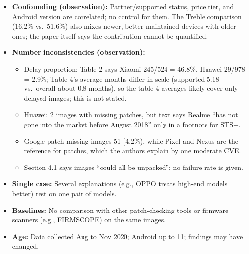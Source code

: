 \documentclass[11pt,a4paper]{article}
\begin{document}
\begin{enumerate}
\begin{itemize}[leftmargin=*,itemsep=1pt,topsep=2pt]
\begin{itemize}[itemsep=0pt]
            \item Observation: Q3 ``unfixed'' compares CVE disclosure time with ROM build time and app version; apps patched at the module level with unchanged version strings could be mislabeled.
            \item Observation: causal wording (``insufficient security efforts'', ``developer gave up maintaining'', ``excessive trust'') is not tested; Table 4 shows correlations only.
        \end{itemize}
        \item \textbf{Confounding (observation):} Partner/supported status, price tier, and Android version are correlated; no control for them. The Treble comparison (16.2\% vs.\ 51.6\%) also mixes newer, better-maintained devices with older ones; the paper itself says the contribution cannot be quantified.
        \item \textbf{Number inconsistencies (observation):}
        \begin{itemize}[itemsep=0pt]
            \item Delay proportion: Table 2 says Xiaomi 245/524 = 46.8\%, Huawei 29/978 = 2.9\%; Table 4's average months differ in scale (supported 5.18 vs.\ overall about 0.8 months), so the table 4 averages likely cover only delayed images; this is not stated.
            \item Huawei: 2 images with missing patches, but text says Realme ``has not gone into the market before August 2018'' only in a footnote for STS$-$.
            \item Google patch-missing images 51 (4.2\%), while Pixel and Nexus are the reference for patches, which the authors explain by one moderate CVE.
            \item Section 4.1 says images ``could all be unpacked''; no failure rate is given.
        \end{itemize}
        \item \textbf{Single case:} Several explanations (e.g., OPPO treats high-end models better) rest on one pair of models.
        \item \textbf{Baselines:} No comparison with other patch-checking tools or firmware scanners (e.g., FIRMSCOPE) on the same images.
        \item \textbf{Age:} Data collected Aug to Nov 2020; Android up to 11; findings may have changed.
    \end{itemize}


\end{enumerate}
\end{document}

